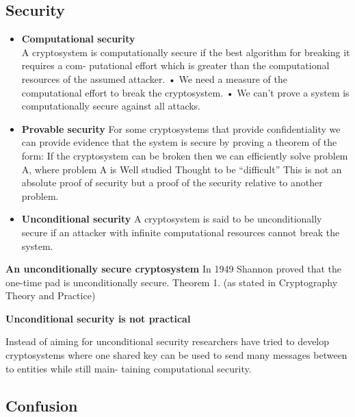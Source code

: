 \subsection{Security}
\begin{itemize}
    \item \textbf{Computational security}\\
        A cryptosystem is computationally secure if the best algorithm for breaking it requires a com- putational effort which is greater than the computational resources of the assumed attacker.
        • We need a measure of the computational effort to break the cryptosystem. • We can’t prove a system is computationally secure against all attacks.

    \item \textbf{Provable security}
        For some cryptosystems that provide confidentiality we can provide evidence that the system is secure by proving a theorem of the form:
        If the cryptosystem can be broken then we can efficiently solve problem A, where problem A is
        Well studied
        Thought to be “difficult”
        This is not an absolute proof of security but a proof of the security relative to another problem.

    \item \textbf{Unconditional security}
        A cryptosystem is said to be unconditionally secure if an attacker with infinite computational resources cannot break the system.

\end{itemize}

\textbf{An unconditionally secure cryptosystem}
In 1949 Shannon proved that the one-time pad is unconditionally secure.
Theorem 1.
(as stated in Cryptography Theory and Practice)

\textbf{Unconditional security is not practical}

Instead of aiming for unconditional security researchers have tried to develop cryptosystems where one shared key can be used to send many messages between to entities while still main- taining computational security.


\subsection{Confusion}
